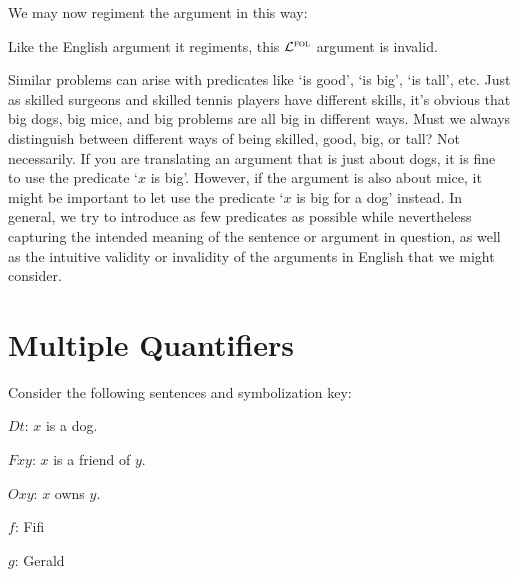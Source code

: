 We may now regiment the argument in this way:

\begin{earg} \label{surgeon3correct}
\end{earg}

Like the English argument it regiments, this $\mathcal{L}^{\textsc{fol}}$ argument is invalid. 

Similar problems can arise with predicates like `is good', `is big', `is tall', etc.
Just as skilled surgeons and skilled tennis players have different skills, it's obvious that big dogs, big mice, and big problems are all big in different ways.
Must we always distinguish between different ways of being skilled, good, big, or tall? 
Not necessarily.
If you are translating an argument that is just about dogs, it is fine to use the predicate `$x$ is big'.
However, if the argument is also about mice, it might be important to let use the predicate `$x$ is big for a dog' instead.
In general, we try to introduce as few predicates as possible while nevertheless capturing the intended meaning of the sentence or argument in question, as well as the intuitive validity or invalidity of the arguments in English that we might consider.






\section{Multiple Quantifiers}

Consider the following sentences and symbolization key:

\begin{multicols}{2}
  
\begin{ekey}
  \item[$Dt$:] $x$ is a dog.
  \item[$Fxy$:] $x$ is a friend of $y$.
  \item[$Oxy$:] $x$ owns $y$.
  \item[$f$:] Fifi
  \item[$g$:] Gerald
\end{ekey}

\begin{earg} \label{dog}
\end{earg}

\end{multicols}

